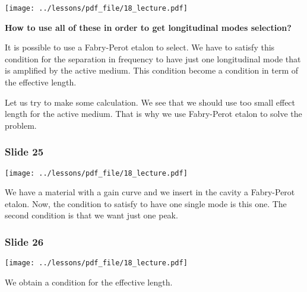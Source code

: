 \documentclass[../main/main.tex]{subfiles}
\begin{document}
\begin{minipage}[]{0.5\linewidth}
\centering
\texttt{[image: ../lessons/pdf\_file/18\_lecture.pdf]}
\end{minipage}
\hspace{0.3cm}\vspace{0.3cm}
\begin{minipage}[c]{0.47\linewidth}

\textbf{How to use all of these in order to get longitudinal modes selection?}

It is possible to use a Fabry-Perot etalon to select. We have to satisfy this condition for the separation in frequency to have just one longitudinal mode that is amplified by the active medium. This condition become a condition in term of the effective length.

Let us try to make some calculation.
We see that we should use too small effect length for the active medium. That is why we use Fabry-Perot etalon to solve the problem.

\end{minipage}

\subsubsection*{Slide 25}

\begin{minipage}[]{0.5\linewidth}
\centering
\texttt{[image: ../lessons/pdf\_file/18\_lecture.pdf]}
\end{minipage}
\hspace{0.3cm}\vspace{0.3cm}
\begin{minipage}[c]{0.47\linewidth}

We have a material with a gain curve and we insert in the cavity a Fabry-Perot etalon. Now, the condition to satisfy to have one single mode is this one.
The second condition is that we want just one peak.


\end{minipage}

\subsubsection*{Slide 26}

\begin{minipage}[]{0.5\linewidth}
\centering
\texttt{[image: ../lessons/pdf\_file/18\_lecture.pdf]}
\end{minipage}
\hspace{0.3cm}\vspace{0.3cm}
\begin{minipage}[c]{0.47\linewidth}

We obtain a condition for the effective length.

\end{minipage}
\end{document}
